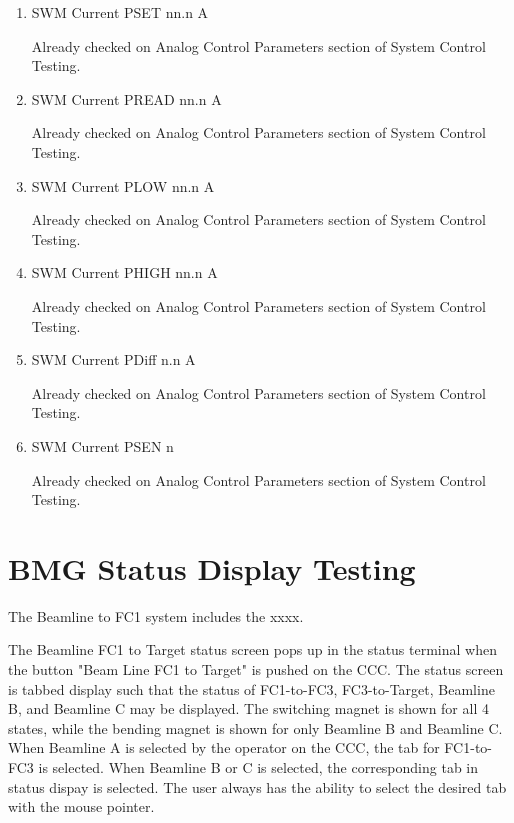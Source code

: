\documentclass[11pt]{book}		%
\begin{document}
\begin{enumerate}
 \item SWM Current PSET   nn.n A

\color{red}
Already checked on Analog Control Parameters section of System Control Testing.
\color{black}

 \item SWM Current PREAD  nn.n A

\color{red}
Already checked on Analog Control Parameters section of System Control Testing.
\color{black}

 \item SWM Current PLOW   nn.n A

\color{red}
Already checked on Analog Control Parameters section of System Control Testing.
\color{black}

 \item SWM Current PHIGH  nn.n A

\color{red}
Already checked on Analog Control Parameters section of System Control Testing.
\color{black}

 \item SWM Current PDiff n.n A

\color{red}
Already checked on Analog Control Parameters section of System Control Testing.
\color{black}

 \item SWM Current PSEN  n

\color{red}
Already checked on Analog Control Parameters section of System Control Testing.
\color{black}

\end{enumerate}






\chapter{BMG Status Display Testing}

The Beamline to FC1 system includes the xxxx.

The Beamline FC1 to Target status screen pops up in the status terminal when the button "Beam Line FC1 to Target" is pushed on the CCC. The status screen is tabbed display such that the status of FC1-to-FC3, FC3-to-Target, Beamline B, and Beamline C may be displayed.  The switching magnet is shown for all 4 states, while the bending magnet is shown for only Beamline B and Beamline C.  When Beamline A is selected by the operator on the CCC, the tab for FC1-to-FC3 is selected. When Beamline B or C is selected, the corresponding tab in status dispay is selected. The user always has the ability to select the desired tab with the mouse pointer.
\end{document}
